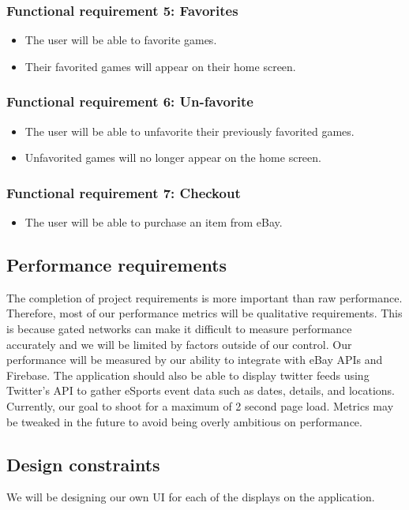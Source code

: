\documentclass[onecolumn, draftclsnofoot,10pt, compsoc]{IEEEtran}
\begin{document}
\subsubsection{Functional requirement 5: Favorites}
\begin{itemize}
\item The user will be able to favorite games.
\item Their favorited games will appear on their home screen.
\end{itemize}

\subsubsection{Functional requirement 6: Un-favorite}
\begin{itemize}
\item The user will be able to unfavorite their previously favorited games.
\item Unfavorited games will no longer appear on the home screen.
\end{itemize}

\subsubsection{Functional requirement 7: Checkout}
\begin{itemize}
\item The user will be able to purchase an item from eBay.
\end{itemize}

\subsection{Performance requirements}
The completion of project requirements is more important than raw performance. Therefore, most of our performance
metrics will be qualitative requirements.  This is because gated networks can make it difficult to measure performance accurately and we will be limited by factors outside of our control. Our performance will be measured by our ability to integrate with eBay APIs and Firebase. The application should also be able to display twitter feeds using Twitter’s API 
to gather eSports event data such as dates, details, and locations. Currently, our goal to shoot for a maximum of 2 second page load. Metrics may be tweaked in the future to avoid being overly ambitious on performance.

\subsection{Design constraints}
 We will be designing our own UI for each of the displays on the application. 
 
\end{document}
